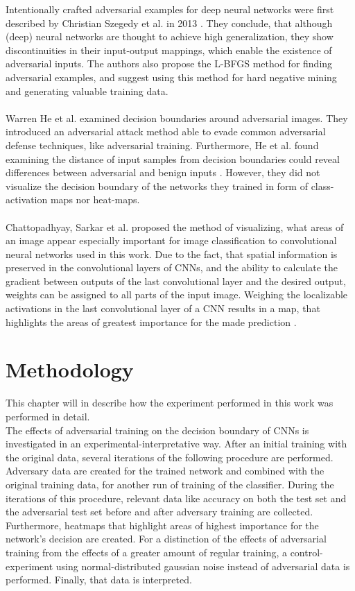 \documentclass[draft,final]{vutinfth} %
\begin{document}
Intentionally crafted adversarial examples for deep neural networks were first described by Christian Szegedy et al. in 2013 \cite{Szegedy2013}.
They conclude, that although (deep) neural networks are thought to achieve high generalization, they show discontinuities in their input-output mappings, which enable the existence of adversarial inputs.
The authors also propose the L-BFGS method for finding adversarial examples, and suggest using this method for hard negative mining and generating valuable training data.\\
\\
Warren He et al. examined decision boundaries around adversarial images.
They introduced an adversarial attack method able to evade common adversarial defense techniques, like adversarial training.
Furthermore, He et al. found examining the distance of input samples from decision boundaries could reveal differences between adversarial and benign inputs \cite{He2018}.
However, they did not visualize the decision boundary of the networks they trained in form of class-activation maps nor heat-maps.\\
\\
Chattopadhyay, Sarkar et al. proposed the method of visualizing, what areas of an image appear especially important for image classification to convolutional neural networks used in this work. 
Due to the fact, that spatial information is preserved in the convolutional layers of CNNs, and the ability to calculate the gradient between outputs of the last convolutional layer and the desired output, weights can be assigned to all parts of the input image.
Weighing the localizable activations in the last convolutional layer of a CNN results in a map, that highlights the areas of greatest importance for the made prediction \cite{Chattopadhyay2017}.\\



\chapter{Methodology}

This chapter will in describe how the experiment performed in this work was performed in detail. \\
The effects of adversarial training on the decision boundary of CNNs is investigated in an experimental-interpretative way.
After an initial training with the original data, several iterations of the following procedure are performed.
Adversary data are created for the trained network and combined with the original training data, for another run of training of the classifier.
During the iterations of this procedure, relevant data like accuracy on both the test set and the adversarial test set before and after adversary training are collected. 
Furthermore, heatmaps that highlight areas of highest importance for the network's decision are created.
For a distinction of the effects of adversarial training from the effects of a greater amount of regular training, a control-experiment using normal-distributed gaussian noise instead of adversarial data is performed.
Finally, that data is interpreted.
\end{document}
